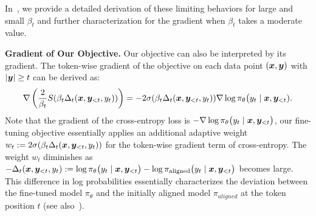 In~, we provide a detailed derivation of these limiting behaviors for large and small $\beta_t$ and further characterization for the gradient when $\beta_t$ takes a moderate value.

\textbf{Gradient of Our Objective.} Our objective can also be interpreted by its gradient. The token-wise gradient of the objective on each data point $(\bm{x}, \bm{y})$ with $|\bm{y}| \ge t$ can be derived as:
\begin{equation}
    \nabla \left( \frac{2}{\beta_t} S(\beta_t \Delta_t(\bm{x}, \bm{y}_{<t}, y_t)) \right)
    = - 2  \sigma(\beta_t \Delta_t(\bm{x}, \bm{y}_{<t}, y_t)) \nabla \log \pi_{\theta}\big(y_t \mid \bm{x}, \bm{y}_{<t}).
\end{equation}
Note that the gradient of the cross-entropy loss is $-\nabla \log \pi_{\theta}\big(y_t \mid \bm{x}, \bm{y}_{<t}\big)$, our fine-tuning objective essentially applies an additional adaptive weight $w_t := 2\sigma(\beta_t \Delta_t(\bm{x}, \bm{y}_{<t}, y_t))$ for the token-wise gradient term of cross-entropy. The weight $w_t$ diminishes as $-\Delta_t(\bm{x}, \bm{y}_{<t}, y_t) := \log \pi_{\theta}\big(y_t \mid \bm{x}, \bm{y}_{<t} \big) - \log \pi_{\mathrm{aligned}}\big(y_t \mid \bm{x}, \bm{y}_{<t} \big) $ becomes large.
This difference in log probabilities essentially characterizes the deviation between the fine-tuned model $\pi_{\theta}$ and the initially aligned model $\pi_{aligned}$ at the token position $t$ (see also~).

